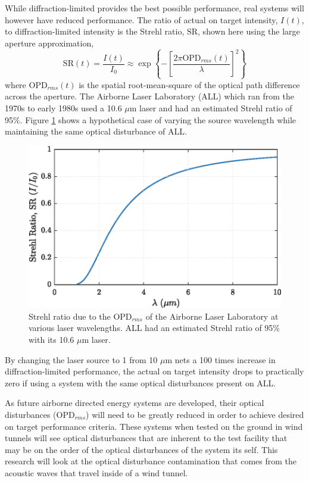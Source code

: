 While diffraction-limited provides the best possible performance, real systems will however have reduced performance.
The ratio of actual on target intensity, $I(t)$, to diffraction-limited intensity is the Strehl ratio, $\textrm{SR}$, shown here using the large aperture approximation,
\begin{equation}
  \textrm{SR}(t) = \frac{I(t)}{I_0} \approx \exp\left\{-\left[\frac{2\pi \textrm{OPD}_{rms}(t)}{\lambda}\right]^2\right\}
  \label{eqn:01_strehl_ratio}
\end{equation}
where $\textrm{OPD}_{rms}(t)$ is the spatial root-mean-square of the optical path difference across the aperture.
The Airborne Laser Laboratory (ALL) which ran from the 1970s to early 1980s used a 10.6 $\mu$m laser and had an estimated Strehl ratio of 95\%\cite{Jumper-2013-8KtN3pue}.
Figure \ref{fig:01_strehl_ratio} shows a hypothetical case of varying the source wavelength while maintaining the same optical disturbance of ALL.
\begin{figure}
  \centering
  \includegraphics{../matlab/01_introduction/strehl_ratio.eps}
  \caption{Strehl ratio due to the $\textrm{OPD}_{rms}$ of the Airborne Laser Laboratory at various laser wavelengths.  ALL had an estimated Strehl ratio of 95\% with its 10.6 $\mu$m laser.}
  \label{fig:01_strehl_ratio}
\end{figure}
By changing the laser source to 1 from 10 $\mu$m nets a 100 times increase in diffraction-limited performance, the actual on target intensity drops to practically zero if using a system with the same optical disturbances present on ALL.

As future airborne directed energy systems are developed, their optical disturbances ($\textrm{OPD}_{rms}$) will need to be greatly reduced in order to achieve desired on target performance criteria.
These systems when tested on the ground in wind tunnels will see optical disturbances that are inherent to the test facility that may be on the order of the optical disturbances of the system its self.
This research will look at the optical disturbance contamination that comes from the acoustic waves that travel inside of a wind tunnel.
